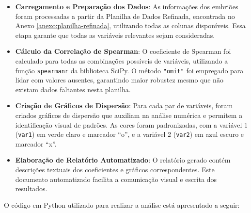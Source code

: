 \begin{itemize}
    \item \textbf{Carregamento e Preparação dos Dados}: As informações dos embriões foram processadas a partir da Planilha de Dados Refinada, encontrada no Anexo \ref{anexo:planilha-refinada}, utilizando todas as colunas disponíveis. Essa etapa garante que todas as variáveis relevantes sejam consideradas.
    \item \textbf{Cálculo da Correlação de Spearman}: O coeficiente de Spearman foi calculado para todas as combinações possíveis de variáveis, utilizando a função \texttt{spearmanr} da biblioteca SciPy. O método \texttt{"omit"} foi empregado para lidar com valores ausentes, garantindo maior robustez mesmo que não existam dados faltantes nesta planilha.
    \item \textbf{Criação de Gráficos de Dispersão}: Para cada par de variáveis, foram criados gráficos de dispersão que auxiliam na análise numérica e permitem a identificação visual de padrões. As cores foram padronizadas, com a variável 1 (\texttt{var1}) em verde claro e marcador ``o'', e a variável 2 (\texttt{var2}) em azul escuro e marcador ``x''.
    \item \textbf{Elaboração de Relatório Automatizado}: O relatório gerado contém descrições textuais dos coeficientes e gráficos correspondentes. Este documento automatizado facilita a comunicação visual e escrita dos resultados.
\end{itemize}

O código em Python utilizado para realizar a análise está apresentado a seguir:

